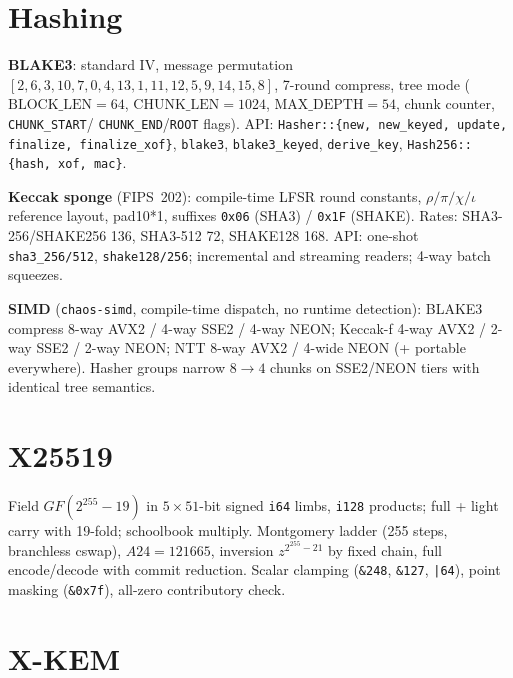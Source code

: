 \documentclass[11pt,a4paper]{article}
\begin{document}
\section{Hashing}
\label{sec:hash}

\textbf{BLAKE3}: standard IV, message permutation
$[2,6,3,10,7,0,4,13,1,11,12,5,9,14,15,8]$, 7-round compress, tree mode
($\mathrm{BLOCK\_LEN} = 64$, $\mathrm{CHUNK\_LEN} = 1024$,
$\mathrm{MAX\_DEPTH} = 54$, chunk counter, \texttt{CHUNK\_START}/
\texttt{CHUNK\_END}/\texttt{ROOT} flags). API: \texttt{Hasher::\{new, new\_keyed,
update, finalize, finalize\_xof\}}, \texttt{blake3}, \texttt{blake3\_keyed},
\texttt{derive\_key}, \texttt{Hash256::\{hash, xof, mac\}}.

\textbf{Keccak sponge} (FIPS~202): compile-time LFSR round constants,
$\rho/\pi/\chi/\iota$ reference layout, pad10*1, suffixes \texttt{0x06} (SHA3) /
\texttt{0x1F} (SHAKE). Rates: SHA3-256/SHAKE256 136, SHA3-512 72, SHAKE128 168.
API: one-shot \texttt{sha3\_256/512}, \texttt{shake128/256}; incremental and
streaming readers; 4-way batch squeezes.

\textbf{SIMD} (\texttt{chaos-simd}, compile-time dispatch, no runtime detection):
BLAKE3 compress 8-way AVX2 / 4-way SSE2 / 4-way NEON; Keccak-f 4-way AVX2 / 2-way
SSE2 / 2-way NEON; NTT 8-way AVX2 / 4-wide NEON (+ portable everywhere). Hasher
groups narrow $8 \to 4$ chunks on SSE2/NEON tiers with identical tree semantics.

\section{X25519}
\label{sec:x25519}

Field $GF(2^{255}-19)$ in $5 \times 51$-bit signed \texttt{i64} limbs,
\texttt{i128} products; full + light carry with 19-fold; schoolbook multiply.
Montgomery ladder (255 steps, branchless cswap), $A24 = 121665$, inversion
$z^{2^{255}-21}$ by fixed chain, full encode/decode with commit reduction.
Scalar clamping (\texttt{\&248}, \texttt{\&127}, \texttt{|64}), point masking
(\texttt{\&0x7f}), all-zero contributory check.

\section{X-KEM}
\label{sec:kem}
\end{document}
